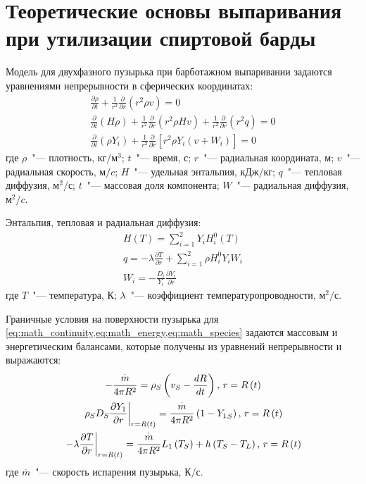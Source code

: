 \section{Теоретические основы выпаривания при утилизации спиртовой барды}

Модель для двухфазного пузырька при барботажном выпаривании задаются уравнениями непрерывности \cite{Campos.Heat.2000} в сферических координатах:
\begin{gather}
\frac{\partial \rho}{\partial t} + \frac{1}{r^{2}}\frac{\partial }{\partial r} (r^{2} \rho v)= 0\label{eq:math_continuity} \\
\frac{\partial}{\partial t}(H \rho)+ \frac{1}{r^{2}} \frac{\partial}{\partial r} \left(r^{2} \rho H v \right)+ \frac{1}{{r}^{2}}\frac{\partial }{\partial r}\left({r}^{2}q\right)=0\label{eq:math_energy} \\
\frac{\partial}{\partial t}(\rho   Y_{i})+ \frac{1}{r^{2}} \frac{\partial}{\partial r} \left[r^{2}  \rho   Y_{i}  \left(v  + W_{i} \right)\right] = 0\label{eq:math_species}
\end{gather}
где \(\rho\)~"--- плотность, \(кг/м^3\); 
\(t\)~"--- время, \(с\);
\(r\)~"--- радиальная координата, \(м\);
\(v\)~"--- радиальная скорость, \(м/c\);
\(H\)~"--- удельная энтальпия, \(кДж/кг\);
\(q\)~"--- тепловая диффузия, \(м^{2}/с\);
\(t\)~"--- массовая доля компонента;
\(W\)~"--- радиальная диффузия, \(м^{2}/c\).

Энтальпия, тепловая  и радиальная диффузия:
\begin{gather}
 H\left(T\right)=\sum _{i=1}^{2}Y_{i}{H}_{i}^{0}\left(T\right)\\
 q=-\lambda \frac{\partial T}{\partial r}+\sum _{i=1}^{2}\rho {H}_{i}^{0}{Y}_{i}{W}_{i}\\
 {W}_{i}=-\frac{{D}_{i}}{{Y}_{i}}\frac{\partial {Y}_{i}}{\partial r} 
\end{gather} 
где \(T\)~"--- температура, \(К\);
\(\lambda\)~"--- коэффициент температуропроводности, \(м^{2}/с\).

Граничные условия на поверхности пузырька для \cref{eq:math_continuity,eq:math_energy,eq:math_species} задаются массовым и энергетическим балансами, которые  получены
из  уравнений непрерывности и выражаются:
 \begin{gather} 
  -\frac{\stackrel{.}{m}}{4\pi {R}^{2}}={\rho }_{S}\left({v}_{S}-\frac{dR}{dt}\right) , \, r=R\left(t\right)\label{eq:math_boundary1} \notag\\
  \left.{\rho }_{S}{D}_{S}{\frac{\partial {Y}_{1}}{\partial r}}\right\vert_{r=R\left(t\right)}=\frac{\stackrel{.}{m}}{4\pi {R}^{2}}\left(1-{Y_1}_{S}\right), \, r=R\left(t\right)\label{eq:math_boundary2}\\
 \left.-\lambda {\frac{\partial T}{\partial r}}\right\vert_{r=R\left(t\right)}=\frac{\stackrel{.}{m}}{4\pi {R}^{2}}{L}_{1}\left({T}_{S}\right)+h\left({T}_{S}-{T}_{L}\right), \, r=R\left(t\right)\label{eq:math_boundary3}\notag
\end{gather} 
где \(\stackrel{.}{m}\)~"--- скорость испарения пузырька, \(К/с\).

